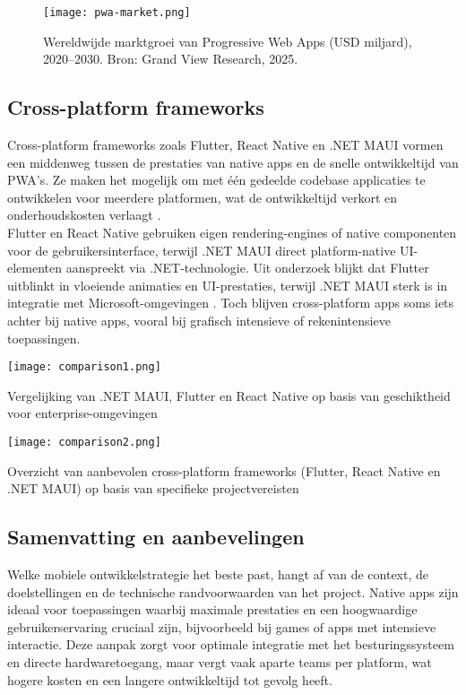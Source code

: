 \begin{figure}[h]
    \centering
    \texttt{[image: pwa-market.png]}
    \caption{Wereldwijde marktgroei van Progressive Web Apps (USD miljard), 2020–2030. Bron: Grand View Research, 2025. \autocite{Research2024}}
    \label{fig:pwa_market}
\end{figure}

\subsection{Cross-platform frameworks}
Cross-platform frameworks zoals Flutter, React Native en .NET MAUI vormen een middenweg tussen de prestaties van native apps en de snelle ontwikkeltijd van PWA’s. Ze maken het mogelijk om met één gedeelde codebase applicaties te ontwikkelen voor meerdere platformen, wat de ontwikkeltijd verkort en onderhoudskosten verlaagt \autocite{Kuppan2024}.\\

Flutter en React Native gebruiken eigen rendering-engines of native componenten voor de gebruikersinterface, terwijl .NET MAUI direct platform-native UI-elementen aanspreekt via .NET-technologie. Uit onderzoek blijkt dat Flutter uitblinkt in vloeiende animaties en UI-prestaties, terwijl .NET MAUI sterk is in integratie met Microsoft-omgevingen \autocite{Gajjam2025}. Toch blijven cross-platform apps soms iets achter bij native apps, vooral bij grafisch intensieve of rekenintensieve toepassingen.

\begin{table}[h]
    \centering
    \texttt{[image: comparison1.png]}
    \caption[Integratie]{Vergelijking van .NET MAUI, Flutter en React Native op basis van geschiktheid voor enterprise-omgevingen \autocite{Gajjam2025}}
    \label{fig:vergelijking}
\end{table}

\begin{table}[h]
    \centering
    \texttt{[image: comparison2.png]}
    \caption[Frameworkkeuze]{Overzicht van aanbevolen cross-platform frameworks (Flutter, React Native en .NET MAUI) op basis van specifieke projectvereisten \autocite{Gajjam2025}}
    \label{tab:frameworkkeuze}
\end{table}

\subsection{Samenvatting en aanbevelingen}
Welke mobiele ontwikkelstrategie het beste past, hangt af van de context, de doelstellingen en de technische randvoorwaarden van het project. Native apps zijn ideaal voor toepassingen waarbij maximale prestaties en een hoogwaardige gebruikerservaring cruciaal zijn, bijvoorbeeld bij games of apps met intensieve interactie. Deze aanpak zorgt voor optimale integratie met het besturingssysteem en directe hardwaretoegang, maar vergt vaak aparte teams per platform, wat hogere kosten en een langere ontwikkeltijd tot gevolg heeft.\\

